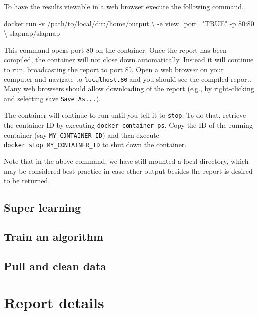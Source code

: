\documentclass[]{article}
\newenvironment{Shaded}{\begin{snugshade}}{\end{snugshade}}
\newcommand{\StringTok}[1]{\textcolor[rgb]{0.31,0.60,0.02}{#1}}
\newcommand{\ExtensionTok}[1]{#1}
\newcommand{\NormalTok}[1]{#1}
\begin{document}
To have the results viewable in a web browser execute the following
command.

\begin{Shaded}
\begin{Highlighting}[]
\ExtensionTok{docker}\NormalTok{ run -v /path/to/local/dir:/home/output \textbackslash{}}
\NormalTok{           -e view_port=}\StringTok{"TRUE"}\NormalTok{ -p 80:80 \textbackslash{}}
\NormalTok{           slapnap/slapnap}
\end{Highlighting}
\end{Shaded}

This command opens port 80 on the container. Once the report has been
compiled, the container will not close down automatically. Instead it
will continue to run, broadcasting the report to port 80. Open a web
browser on your computer and navigate to \texttt{localhost:80} and you
should see the compiled report. Many web browsers should allow
downloading of the report (e.g., by right-clicking and selecting save
\texttt{Save\ As...}).

The container will continue to run until you tell it to \texttt{stop}.
To do that, retrieve the container ID by executing
\texttt{docker\ container\ ps}. Copy the ID of the running container
(say \texttt{MY\_CONTAINER\_ID}) and then execute
\texttt{docker\ stop\ MY\_CONTAINER\_ID} to shut down the container.

Note that in the above command, we have still mounted a local directory,
which may be considered best practice in case other output besides the
report is desired to be returned.

\subsection{Super learning}\label{super-learning}

\subsection{Train an algorithm}\label{train-an-algorithm}

\subsection{Pull and clean data}\label{pull-and-clean-data}

\section{Report details}\label{sec:report}
\end{document}
